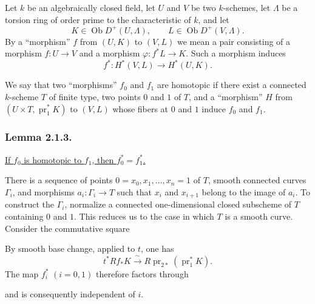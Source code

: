 Let $k$ be an algebraically closed field, let $U$ and $V$ be two
$k$-schemes, let $\Lambda$ be a torsion ring of order prime to the
characteristic of $k$, and let
\[
K\in\operatorname{Ob}D^+(U,\Lambda),
\qquad L\in\operatorname{Ob}D^+(V,\Lambda).
\]
By a ``morphism'' $f$ from $(U,K)$ to $(V,L)$ we mean a pair
consisting of a morphism $f:U\to V$ and a morphism
$\varphi:f^*L\to K$.  Such a morphism induces
\[
f^*:H^*(V,L)\longrightarrow H^*(U,K).
\]

We say that two ``morphisms'' $f_0$ and $f_1$ are homotopic if there
exist a connected $k$-scheme $T$ of finite type, two points $0$ and
$1$ of $T$, and a ``morphism'' $H$ from
$(U\times T,\operatorname{pr}_1^*K)$ to $(V,L)$ whose fibers at $0$
and $1$ induce $f_0$ and $f_1$.

\subsubsection*{Lemma 2.1.3.}
\underline{If $f_0$ is homotopic to $f_1$, then
$f_0^*=f_1^*$.}

There is a sequence of points
$0=x_0,x_1,\ldots,x_n=1$ of $T$, smooth connected curves
$\Gamma_i$, and morphisms $a_i:\Gamma_i\to T$ such that $x_i$ and
$x_{i+1}$ belong to the image of $a_i$.  To construct the
$\Gamma_i$, normalize a connected one-dimensional closed subscheme
of $T$ containing $0$ and $1$.  This reduces us to the case in which
$T$ is a smooth curve.  Consider the commutative square
\begin{center}
\end{center}
By smooth base change, applied to $t$, one has
\[
t^*Rf_*K\xrightarrow{\ \sim\ }
R\operatorname{pr}_{2*}(\operatorname{pr}_1^*K).
\]
The map $f_i^*$ $(i=0,1)$ therefore factors through
\begin{center}
\end{center}
and is consequently independent of $i$.
